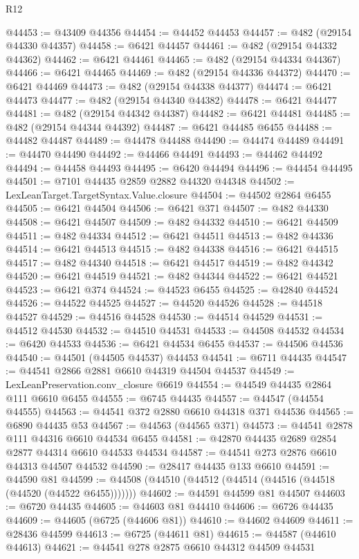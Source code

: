 \begin{lexlean}{R12}
\begin{coremodule}
@44453 := @43409 @44356
@44454 := @44452 @44453
@44457 := @482 (@29154 @44330 @44357)
@44458 := @6421 @44457
@44461 := @482 (@29154 @44332 @44362)
@44462 := @6421 @44461
@44465 := @482 (@29154 @44334 @44367)
@44466 := @6421 @44465
@44469 := @482 (@29154 @44336 @44372)
@44470 := @6421 @44469
@44473 := @482 (@29154 @44338 @44377)
@44474 := @6421 @44473
@44477 := @482 (@29154 @44340 @44382)
@44478 := @6421 @44477
@44481 := @482 (@29154 @44342 @44387)
@44482 := @6421 @44481
@44485 := @482 (@29154 @44344 @44392)
@44487 := @6421 @44485 @6455
@44488 := @44482 @44487
@44489 := @44478 @44488
@44490 := @44474 @44489
@44491 := @44470 @44490
@44492 := @44466 @44491
@44493 := @44462 @44492
@44494 := @44458 @44493
@44495 := @6420 @44494
@44496 := @44454 @44495
@44501 := @7101 @44435 @2859 @2882 @44320 @44348
@44502 := LexLeanTarget.TargetSyntax.Value.closure
@44504 := @44502 @2864 @6455
@44505 := @6421 @44504
@44506 := @6421 @371
@44507 := @482 @44330
@44508 := @6421 @44507
@44509 := @482 @44332
@44510 := @6421 @44509
@44511 := @482 @44334
@44512 := @6421 @44511
@44513 := @482 @44336
@44514 := @6421 @44513
@44515 := @482 @44338
@44516 := @6421 @44515
@44517 := @482 @44340
@44518 := @6421 @44517
@44519 := @482 @44342
@44520 := @6421 @44519
@44521 := @482 @44344
@44522 := @6421 @44521
@44523 := @6421 @374
@44524 := @44523 @6455
@44525 := @42840 @44524
@44526 := @44522 @44525
@44527 := @44520 @44526
@44528 := @44518 @44527
@44529 := @44516 @44528
@44530 := @44514 @44529
@44531 := @44512 @44530
@44532 := @44510 @44531
@44533 := @44508 @44532
@44534 := @6420 @44533
@44536 := @6421 @44534 @6455
@44537 := @44506 @44536
@44540 := @44501 (@44505 @44537) @44453
@44541 := @6711 @44435
@44547 := @44541 @2866 @2881 @6610 @44319 @44504 @44537
@44549 := LexLeanPreservation.conv_closure @6619
@44554 := @44549 @44435 @2864 @111 @6610 @6455
@44555 := @6745 @44435
@44557 := @44547 (@44554 @44555)
@44563 := @44541 @372 @2880 @6610 @44318 @371 @44536
@44565 := @6890 @44435 @53
@44567 := @44563 (@44565 @371)
@44573 := @44541 @2878 @111 @44316 @6610 @44534 @6455
@44581 := @42870 @44435 @2689 @2854 @2877 @44314 @6610 @44533 @44534
@44587 := @44541 @273 @2876 @6610 @44313 @44507 @44532
@44590 := @28417 @44435 @133 @6610
@44591 := @44590 @81
@44599 := @44508 (@44510 (@44512 (@44514 (@44516 (@44518 (@44520 (@44522 @6455)))))))
@44602 := @44591 @44599 @81 @44507
@44603 := @6720 @44435
@44605 := @44603 @81 @44410
@44606 := @6726 @44435
@44609 := @44605 (@6725 (@44606 @81))
@44610 := @44602 @44609
@44611 := @28436 @44599
@44613 := @6725 (@44611 @81)
@44615 := @44587 (@44610 @44613)
@44621 := @44541 @278 @2875 @6610 @44312 @44509 @44531

\end{coremodule}
\end{lexlean}
